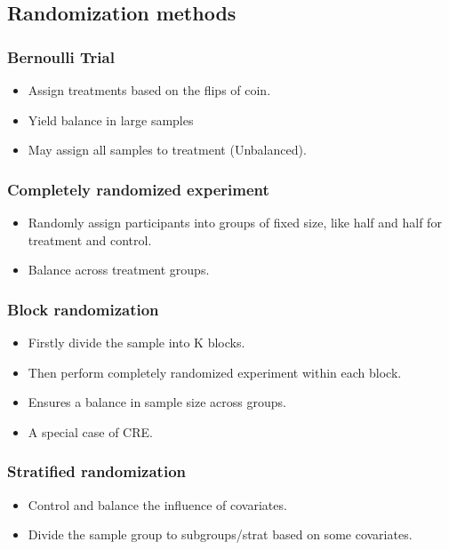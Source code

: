 \subsection{Randomization methods}
\subsubsection*{Bernoulli Trial}
\begin{itemize}
    \item Assign treatments based on the flips of coin.
    \item Yield balance in large samples
    \item May assign all samples to treatment (Unbalanced).
\end{itemize}
\subsubsection*{Completely randomized experiment}
\begin{itemize}
    \item Randomly assign participants into groups of fixed size, like half and half for treatment and control.
    \item Balance across treatment groups.
\end{itemize}
\subsubsection*{Block randomization}
\begin{itemize}
    \item Firstly divide the sample into K blocks.
    \item Then perform completely randomized experiment within each block.
    \item Ensures a balance in sample size across groups.
    \item A special case of CRE.
\end{itemize}
\subsubsection*{Stratified randomization}
\begin{itemize}
    \item Control and balance the influence of covariates.
    \item Divide the sample group to subgroups/strat based on some covariates.
\end{itemize}

